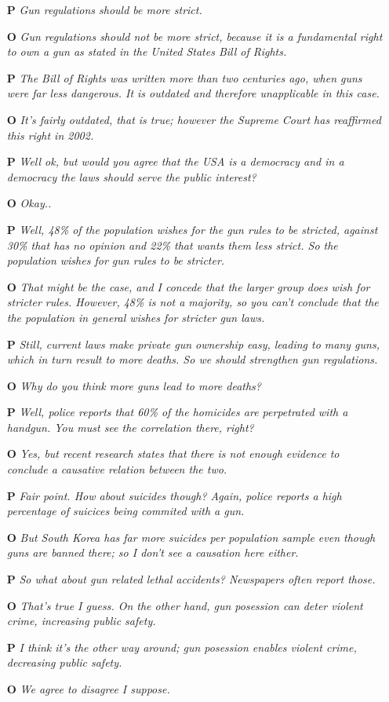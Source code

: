 \documentclass[]{article}
\begin{document}
\begin{itemize}
\item[\textbf{P}]  \textit{Gun regulations should be more strict.}
\item[\textbf{O}]  \textit{Gun regulations should not be more strict, because it is a fundamental right to own a gun as stated in the United States Bill of Rights.}
\item[\textbf{P}]  \textit{The Bill of Rights was written more than two centuries ago, when guns were far less dangerous. It is outdated and therefore unapplicable in this case.}
\item[\textbf{O}]  \textit{It's fairly outdated, that is true; however the Supreme Court has reaffirmed this right in 2002.}
\item[\textbf{P}] \textit{ Well ok, but would you agree that the USA is a democracy and in a democracy the laws should serve the public interest?}
\item[\textbf{O}]  \textit{Okay..}
\item[\textbf{P}]  \textit{Well, 48\% of the population wishes for the gun rules to be stricted, against 30\% that has no opinion and 22\% that wants them less strict. So the population wishes for gun rules to be stricter.}
\item[\textbf{O}]  \textit{That might be the case, and I concede that the larger group does wish for stricter rules. However, 48\% is not a majority, so you can't conclude that the the population in general wishes for stricter gun laws.}
\item[\textbf{P}]  \textit{Still, current laws make private gun ownership easy, leading to many guns, which in turn result to more deaths. So we should strengthen gun regulations. }
\item[\textbf{O}]  \textit{Why do you think more guns lead to more deaths?}
\item[\textbf{P}]  \textit{Well, police reports that 60\% of the homicides are perpetrated with a handgun. You must see the correlation there, right?}
\item[\textbf{O}]  \textit{Yes, but recent research states that there is not enough evidence to conclude a causative relation between the two.}
\item[\textbf{P}] \textit{Fair point. How about suicides though? Again, police reports a high percentage of suicices being commited with a gun.}
\item[\textbf{O}]  \textit{But South Korea has far more suicides per population sample even though guns are banned there; so I don't see a causation here either.}
\item[\textbf{P}]  \textit{So what about gun related lethal accidents? Newspapers often report those.}
\item[\textbf{O}]  \textit{That's true I guess. On the other hand, gun posession can deter violent crime, increasing public safety.}
\item[\textbf{P}] \textit{ I think it's the other way around; gun posession enables violent crime, decreasing public safety.}
\item[\textbf{O}]  \textit{We agree to disagree I suppose.}
\end{itemize} 
\end{document}
